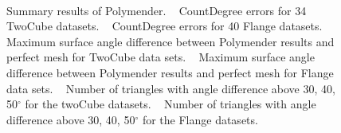\begin{figure}[htb]
		\\
		\caption{Summary results of Polymender.
			~\protect{} CountDegree errors for 34 TwoCube datasets.
			~\protect{} CountDegree errors for 40 Flange datasets. 
			~\protect{} Maximum surface angle difference between Polymender results and perfect mesh for TwoCube data sets.
			~\protect{} Maximum surface angle difference between Polymender results and perfect mesh for Flange data sets.
			~\protect{} Number of triangles with angle difference above 30, 40, 50$^\circ$ for the twoCube datasets.
			~\protect{} Number of triangles with angle difference above 30, 40, 50$^\circ$ for the Flange datasets.}	
		\label{fig:polymenderA}
\end{figure}
